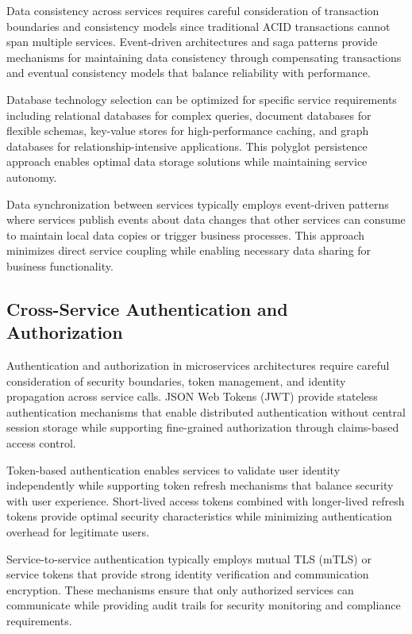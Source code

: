 Data consistency across services requires careful consideration of transaction boundaries and consistency models since traditional ACID transactions cannot span multiple services. Event-driven architectures and saga patterns provide mechanisms for maintaining data consistency through compensating transactions and eventual consistency models that balance reliability with performance.

Database technology selection can be optimized for specific service requirements including relational databases for complex queries, document databases for flexible schemas, key-value stores for high-performance caching, and graph databases for relationship-intensive applications. This polyglot persistence approach enables optimal data storage solutions while maintaining service autonomy.

Data synchronization between services typically employs event-driven patterns where services publish events about data changes that other services can consume to maintain local data copies or trigger business processes. This approach minimizes direct service coupling while enabling necessary data sharing for business functionality.

\subsection{Cross-Service Authentication and Authorization}

Authentication and authorization in microservices architectures require careful consideration of security boundaries, token management, and identity propagation across service calls. JSON Web Tokens (JWT) provide stateless authentication mechanisms that enable distributed authentication without central session storage while supporting fine-grained authorization through claims-based access control.

Token-based authentication enables services to validate user identity independently while supporting token refresh mechanisms that balance security with user experience. Short-lived access tokens combined with longer-lived refresh tokens provide optimal security characteristics while minimizing authentication overhead for legitimate users.

Service-to-service authentication typically employs mutual TLS (mTLS) or service tokens that provide strong identity verification and communication encryption. These mechanisms ensure that only authorized services can communicate while providing audit trails for security monitoring and compliance requirements.

